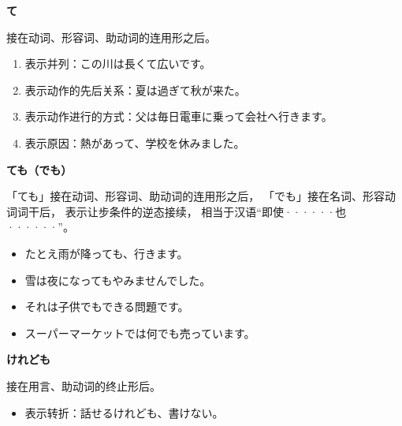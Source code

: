 {\bf
\noindent て
}

接在动词、形容词、助动词的连用形之后。
\begin{enumerate}
  \item 表示并列：この川は長くて広いです。
  \item 表示动作的先后关系：夏は過ぎて秋が来た。
  \item 表示动作进行的方式：父は毎日電車に乗って会社へ行きます。
  \item 表示原因：熱があって、学校を休みました。
\end{enumerate}

{\bf
\noindent ても（でも）
}

「ても」接在动词、形容词、助动词的连用形之后，
「でも」接在名词、形容动词词干后，
表示让步条件的逆态接续，
相当于汉语``即使······也······''。
\begin{itemize}
  \item たとえ雨が降っても、行きます。
  \item 雪は夜になってもやみませんでした。
  \item それは子供でもできる問題です。
  \item スーパーマーケットでは何でも売っています。
\end{itemize}


{\bf
\noindent けれども
}

接在用言、助动词的终止形后。
\begin{itemize}
  \item 表示转折：話せるけれども、書けない。
\end{itemize}
